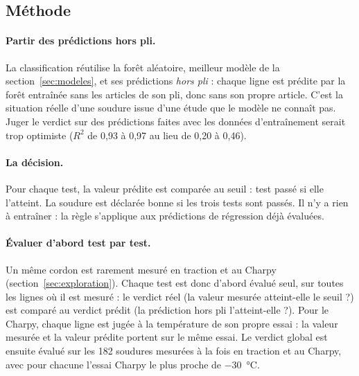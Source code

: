 \subsection{Méthode}\label{sec:classif-methode}

\paragraph{Partir des prédictions hors pli.} La classification réutilise la forêt
aléatoire, meilleur modèle de la section~\ref{sec:modeles}, et ses prédictions
\emph{hors pli} : chaque ligne est prédite par la forêt entraînée sans les articles de
son pli, donc sans son propre article. C'est la situation réelle d'une soudure issue
d'une étude que le modèle ne connaît pas. Juger le verdict sur des prédictions faites
avec les données d'entraînement serait trop optimiste ($R^2$ de 0,93 à 0,97 au lieu de
0,20 à 0,46).

\paragraph{La décision.} Pour chaque test, la valeur prédite est comparée au seuil :
test passé si elle l'atteint. La soudure est déclarée bonne si les trois tests sont
passés. Il n'y a rien à entraîner : la règle s'applique aux prédictions de régression
déjà évaluées.

\paragraph{Évaluer d'abord test par test.} Un même cordon est rarement mesuré en
traction et au Charpy (section~\ref{sec:exploration}). Chaque test est donc d'abord
évalué seul, sur toutes les lignes où il est mesuré : le verdict réel (la valeur mesurée
atteint-elle le seuil ?) est comparé au verdict prédit (la prédiction hors pli
l'atteint-elle ?). Pour le Charpy, chaque ligne est jugée à la température de son propre
essai : la valeur mesurée et la valeur prédite portent sur le même essai. Le verdict
global est ensuite évalué sur les 182 soudures mesurées à la fois en traction et
au Charpy, avec pour chacune l'essai Charpy le plus proche de \SI{-30}{\celsius}.

